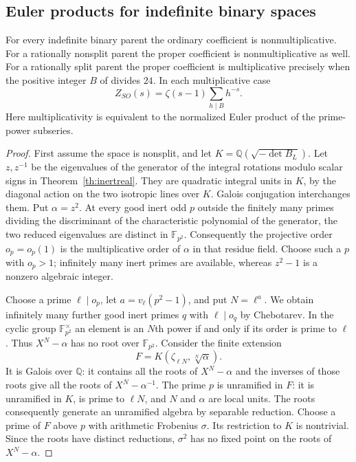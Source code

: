 \subsection{Euler products for indefinite binary spaces}
\begin{theorem}\label{th:binaryeuler}
For every indefinite binary parent the ordinary coefficient is nonmultiplicative.
For a rationally nonsplit parent the proper coefficient is nonmultiplicative as well.
For a rationally split parent the proper coefficient is multiplicative precisely when
the positive integer \(B\) of \cite[Thm.~1.1]{Hyperbolic} divides \(24\).
In each multiplicative case
\[
 Z_{SO}(s)=\zeta(s-1)\sum_{h\mid B}h^{-s}.
\]
Here multiplicativity is equivalent to the normalized Euler product of the prime-power subseries.
\end{theorem}
\begin{proof}
First assume the space is nonsplit, and let \(K=\mathbb Q(\sqrt{-\det B_L})\).
Let \(z,z^{-1}\) be the eigenvalues of the generator of the integral rotations
modulo scalar signs in Theorem~\ref{th:inertreal}. They are quadratic integral units
in \(K\), by the diagonal action on the two isotropic lines over \(K\).
Galois conjugation interchanges them. Put \(\alpha=z^2\).
At every good inert odd \(p\) outside the finitely many primes dividing
the discriminant of the characteristic polynomial of the generator,
the two reduced eigenvalues are distinct in \(\mathbb F_{p^2}\).
Consequently the projective order \(o_p=o_p(1)\) is the multiplicative order
of \(\alpha\) in that residue field. Choose such a \(p\) with \(o_p>1\);
infinitely many inert primes are available, whereas \(z^2-1\) is a nonzero
algebraic integer.

Choose a prime \(\ell\mid o_p\), let \(a=v_\ell(p^2-1)\), and put \(N=\ell^a\).
We obtain infinitely many further good inert primes \(q\) with
\(\ell\mid o_q\) by Chebotarev.
In the cyclic group \(\mathbb F_{p^2}^{\times}\) an element is an \(N\)th power
if and only if its order is prime to \(\ell\). Thus \(X^N-\alpha\) has no
root over \(\mathbb F_{p^2}\). Consider the finite extension
\[
 F=K(\zeta_{\ell N},\sqrt[N]{\alpha}).
\]
It is Galois over \(\mathbb Q\): it contains all the roots of \(X^N-\alpha\)
and the inverses of those roots give all the roots of \(X^N-\alpha^{-1}\).
The prime \(p\) is unramified in \(F\): it is unramified in
\(K\), is prime to \(\ell N\), and \(N\) and \(\alpha\)
are local units. The roots consequently generate an unramified
algebra by separable reduction.
Choose a prime of \(F\) above \(p\) with arithmetic Frobenius \(\sigma\).
Its restriction to \(K\) is nontrivial. Since the roots have distinct
reductions, \(\sigma^2\) has no fixed point on the roots of \(X^N-\alpha\).


\end{proof}
